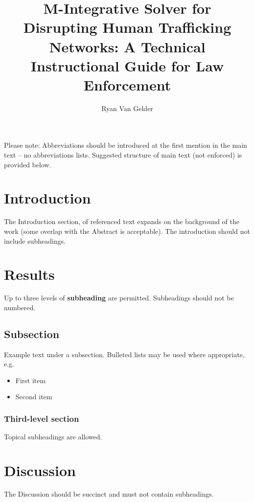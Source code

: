 \documentclass[fleqn,10pt]{wlscirep}
\title{M-Integrative Solver for Disrupting Human Trafficking Networks: A Technical Instructional Guide for Law Enforcement}
\author[1,*]{Ryan Van Gelder}
\affil[1]{Citizen Gardens, Social Physics Department, United States}
\affil[*]{ryan@citizengardens.org}
\begin{document}
\flushbottom
\maketitle
%
%
\thispagestyle{empty}

\noindent Please note: Abbreviations should be introduced at the first mention in the main text – no abbreviations lists. Suggested structure of main text (not enforced) is provided below.

\section*{Introduction}

The Introduction section, of referenced text\cite{Figueredo:2009dg} expands on the background of the work (some overlap with the Abstract is acceptable). The introduction should not include subheadings.

\section*{Results}

Up to three levels of \textbf{subheading} are permitted. Subheadings should not be numbered.

\subsection*{Subsection}

Example text under a subsection. Bulleted lists may be used where appropriate, e.g.

\begin{itemize}
\item First item
\item Second item
\end{itemize}

\subsubsection*{Third-level section}
 
Topical subheadings are allowed.

\section*{Discussion}

The Discussion should be succinct and must not contain subheadings.
\end{document}
